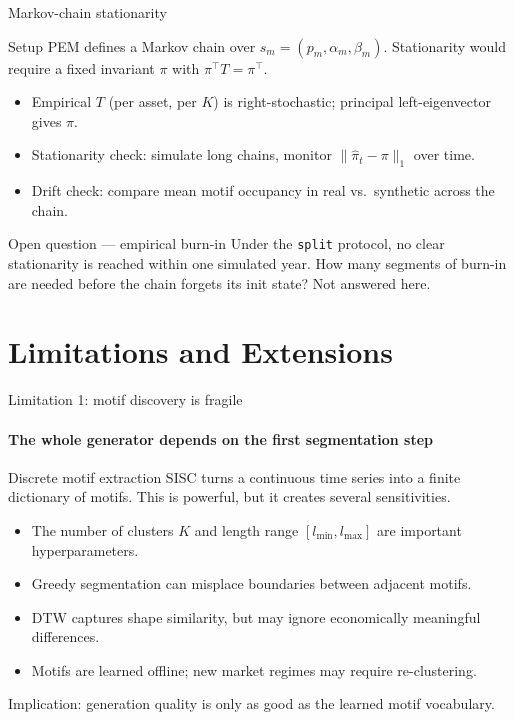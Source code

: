 \begin{frame}{Markov-chain stationarity}
\begin{block}{Setup}
PEM defines a Markov chain over $s_m=(p_m,\alpha_m,\beta_m)$. Stationarity would require a fixed invariant $\pi$ with $\pi^\top T = \pi^\top$.
\end{block}
\begin{itemize}\setlength\itemsep{2pt}
  \item Empirical $T$ (per asset, per $K$) is right-stochastic; principal left-eigenvector gives $\pi$.
  \item Stationarity check: simulate long chains, monitor $\|\hat\pi_t-\pi\|_1$ over time.
  \item Drift check: compare mean motif occupancy in real vs.\ synthetic across the chain.
\end{itemize}
\begin{alertblock}{Open question --- empirical burn-in}
Under the \texttt{split} protocol, no clear stationarity is reached within one simulated year. How many segments of burn-in are needed before the chain forgets its init state? Not answered here.
\end{alertblock}
\end{frame}

\section{Limitations and Extensions}

\begin{frame}{Limitation 1: motif discovery is fragile}
\framesubtitle{The whole generator depends on the first segmentation step}

\begin{block}{Discrete motif extraction}
SISC turns a continuous time series into a finite dictionary of motifs. This is powerful, but it creates several sensitivities.
\end{block}

\begin{itemize}
\item The number of clusters \(K\) and length range \([l_{\min},l_{\max}]\) are important hyperparameters.
\item Greedy segmentation can misplace boundaries between adjacent motifs.
\item DTW captures shape similarity, but may ignore economically meaningful differences.
\item Motifs are learned offline; new market regimes may require re-clustering.
\end{itemize}

\medskip

\alert{Implication:} generation quality is only as good as the learned motif vocabulary.

\end{frame}


